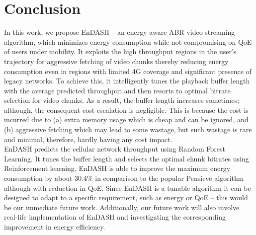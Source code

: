 \section{\textbf{Conclusion}}\label{sec:chap04:conclusion}
\acresetall
In this work, we propose EnDASH -- an energy aware ABR video streaming algorithm, which minimizes energy consumption while not compromising on QoE of users under mobility. It exploits the high throughput regions in the user's trajectory for aggressive fetching of video chunks thereby reducing energy consumption even in regions with limited 4G coverage and significant presence of legacy networks.  To achieve this, it intelligently tunes the playback buffer length with the average predicted throughput and then resorts to optimal bitrate selection for video chunks. As a result, the buffer length increases sometimes; although, the consequent cost  escalation is negligible. This is because the cost is incurred due to  (a) extra memory usage which is cheap  and can be ignored, and (b) aggressive fetching which may lead to some wastage, but such wastage is rare and minimal, therefore, hardly having any cost impact.\\  %
\indent EnDASH predicts the cellular network throughput using Random Forest Learning. It tunes the buffer length and selects the optimal chunk bitrates using Reinforcement learning. EnDASH is able to improve the maximum energy consumption by about 30.4\% in comparison to the popular Pensieve algorithm although with reduction in QoE. Since EnDASH is a tunable algorithm it can be designed to adapt to a specific  requirement, such as energy or QoE -- this would be our immediate future work.  Additionally, our future work will also involve real-life implementation of EnDASH and investigating the corresponding improvement in energy efficiency.